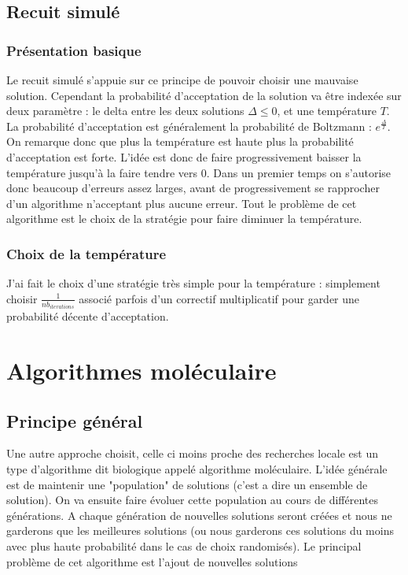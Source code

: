 \documentclass[10pt,a4paper]{article}
\begin{document}
\subsection{Recuit simulé}


\subsubsection{Présentation basique}

Le recuit simulé s'appuie sur ce principe de pouvoir choisir une mauvaise solution. Cependant la probabilité d'acceptation de la solution va être indexée sur deux paramètre : le delta entre les deux solutions $\Delta\leq 0$, et une température $T$. La probabilité d'acceptation est généralement la probabilité de Boltzmann : $e^{\frac{\Delta}{T}}$. On remarque donc que plus la température est haute plus la probabilité d'acceptation est forte. L'idée est donc de faire progressivement baisser la température jusqu'à la faire tendre vers 0. Dans un premier temps on s'autorise donc beaucoup d'erreurs assez larges, avant de progressivement se rapprocher d'un algorithme n'acceptant plus aucune erreur. Tout le problème de cet algorithme est le choix de la stratégie pour faire diminuer la température.

\subsubsection{Choix de la température}

J'ai fait le choix d'une stratégie très simple pour la température : simplement choisir $\frac{1}{nb_{iterations}}$ associé parfois d'un correctif multiplicatif pour garder une probabilité décente d'acceptation.

\section{Algorithmes moléculaire}


\subsection{Principe général}

Une autre approche choisit, celle ci moins proche des recherches locale est un type d'algorithme dit biologique appelé algorithme moléculaire. L'idée générale est de maintenir une "population" de solutions (c'est a dire un ensemble de solution). On va ensuite faire évoluer cette population au cours de différentes générations. A chaque génération de nouvelles solutions seront créées et nous ne garderons que les meilleures solutions (ou nous garderons ces solutions du moins avec plus haute probabilité dans le cas de choix randomisés). Le principal problème de cet algorithme est l'ajout de nouvelles solutions
\end{document}
